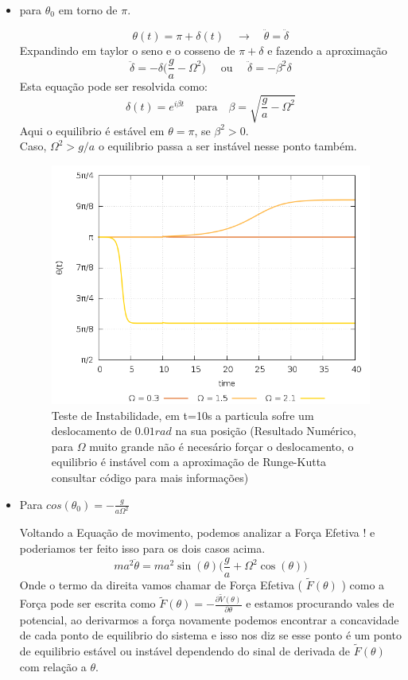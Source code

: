 \documentclass[a4paper,11pt]{exam}
\begin{document}
\begin{itemize}
		\item{para $\theta_0$ em torno de $\pi$.}
		
		\[ \theta(t) = \pi + \delta(t) \quad \to \quad \ddot\theta = \ddot\delta \]
		Expandindo em taylor o seno e o cosseno de $\pi + \delta$ e fazendo a aproximação
		\[ \ddot\delta = -\delta\Big(\frac{g}{a}-\Omega^2\Big) \quad \text{ ou } \quad \ddot\delta = -\beta^2 \delta\]
		Esta equação pode ser resolvida como:
		\[ \delta(t) = e^{i\beta t} \quad \text{para} \quad \beta = \sqrt{\frac{g}{a}-\Omega^2} \]
		Aqui o equilibrio é estável em $\theta = \pi$, se $\beta^2 > 0$.
		\\
		\pagebreak
		Caso, $ \Omega^2 > g/a $ o equilibrio passa a ser instável nesse ponto também.
		
		\begin{figure}[h]
			\centering
			\includegraphics[scale=0.5]{Gr3.png}
			\caption{Teste de Instabilidade, em t=10s a particula sofre um deslocamento de $0.01rad$ na sua posição (Resultado Numérico, para $\Omega$ muito grande não é necesário forçar o deslocamento, o equilibrio é instável com a aproximação de Runge-Kutta consultar código para mais informações)}
		\end{figure}

		\item{ Para $cos(\theta_0) = - \frac{g}{a\Omega^2}$ }

		Voltando a Equação de movimento,  podemos analizar a Força Efetiva ! e poderiamos ter feito isso para os dois casos acima.
		\[ ma^2\ddot\theta = ma^2\sin(\theta)\Big( \frac{g}{a} + \Omega^2 \cos(\theta) \Big) \]
		Onde o termo da direita vamos chamar de Força Efetiva ( $ \tilde F(\theta) $ ) como a Força pode ser escrita como $\tilde F(\theta) = - \frac{\partial \tilde V(\theta)}{\partial \theta}$ e estamos procurando vales de potencial, ao derivarmos a força novamente podemos encontrar a concavidade de cada ponto de equilibrio do sistema e isso nos diz se esse ponto é um ponto de equilibrio estável ou instável dependendo do sinal de derivada de $\tilde F(\theta)$ com relação a $\theta$.
		

\end{itemize}
\end{document}
